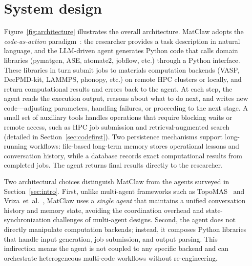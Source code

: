 \documentclass{article}
\begin{document}
\section{System design}
\label{sec:design}

Figure~\ref{fig:architecture} illustrates the overall architecture.
MatClaw adopts the \emph{code-as-action} paradigm~\citep{Wang2024codeact,Qiao2024taskweaver}: the researcher provides a task description in natural language, and the LLM-driven agent generates Python code that calls domain libraries (pymatgen, ASE, atomate2, jobflow, etc.) through a Python interface.
These libraries in turn submit jobs to materials computation backends (VASP, DeePMD-kit, LAMMPS, phonopy, etc.) on remote HPC clusters or locally, and return computational results and errors back to the agent.
At each step, the agent reads the execution output, reasons about what to do next, and writes new code---adjusting parameters, handling failures, or proceeding to the next stage.
A small set of auxiliary tools handles operations that require blocking waits or remote access, such as HPC job submission and retrieval-augmented search (detailed in Section~\ref{sec:codefirst}).
Two persistence mechanisms support long-running workflows: file-based long-term memory stores operational lessons and conversation history, while a database records exact computational results from completed jobs.
The agent returns final results directly to the researcher.

Two architectural choices distinguish MatClaw from the agents surveyed in Section~\ref{sec:intro}.
First, unlike multi-agent frameworks such as TopoMAS~\citep{Zhang2025topo} and Vriza~et~al.~\citep{Vriza2026}, MatClaw uses a \emph{single agent} that maintains a unified conversation history and memory state, avoiding the coordination overhead and state-synchronization challenges of multi-agent designs.
Second, the agent does not directly manipulate computation backends; instead, it composes Python libraries that handle input generation, job submission, and output parsing.
This indirection means the agent is not coupled to any specific backend and can orchestrate heterogeneous multi-code workflows without re-engineering.
\end{document}
